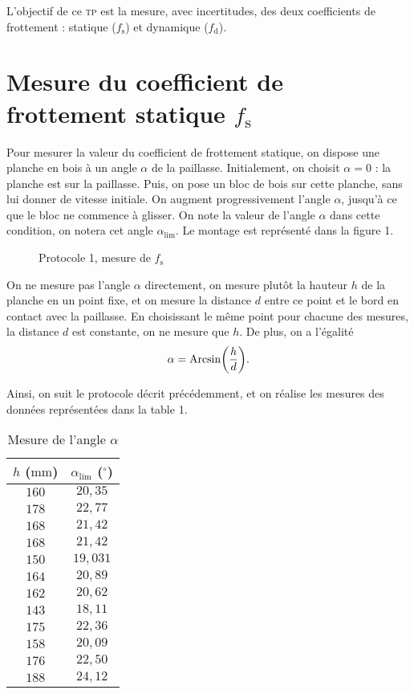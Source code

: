 \documentclass[a4paper,twocolumn,10pt]{report}
\begin{document}
	L'objectif de ce \textsc{tp} est la mesure, avec incertitudes, des deux coefficients de frottement : statique ($f_\mathrm{s}$) et dynamique ($f_\mathrm{d}$).

	\section{Mesure du coefficient de frottement statique $f_\mathrm{s}$}

	Pour mesurer la valeur du coefficient de frottement statique, on dispose une planche en bois à un angle $\alpha$\/ de la paillasse.
	Initialement, on choisit $\alpha = 0$ : la planche est sur la paillasse. Puis, on pose un bloc de bois sur cette planche, sans lui donner de vitesse initiale.
	On augment progressivement l'angle $\alpha$, jusqu'à ce que le bloc ne commence à glisser.
	On note la valeur de l'angle $\alpha$\/ dans cette condition, on notera cet angle $\alpha_{\lim}$.
	Le montage est représenté dans la figure 1.

	\begin{figure}[H]
		\centering
		\caption{Protocole 1, mesure de $f_\mathrm{s}$\/}
	\end{figure}

	On ne mesure pas l'angle $\alpha$\/ directement, on mesure plutôt la hauteur $h$\/ de la planche en un point fixe, et on mesure la distance $d$\/ entre ce point et le bord en contact avec la paillasse.
	En choisissant le même point pour chacune des mesures, la distance $d$\/ est constante, on ne mesure que $h$. De plus, on a l'égalité \[
		\alpha = \operatorname{Arcsin}\! \left( \frac{h}{d} \right)\!
	.\]
	
	Ainsi, on suit le protocole décrit précédemment, et on réalise les mesures des données représentées dans la table 1.

	\begin{table}[H]
		\centering
		\begin{tabular}{|c|c|}
			\hline
			$h$\/ ($\mathrm{mm}$) & $\alpha_{\lim}$\/ ($^\circ$)\\ \hline \hline
			$160$&$20{,}35$ \\ \hline
			$178$&$22{,}77$\\ \hline
			$168$&$21{,}42$\\ \hline
			$168$&$21{,}42$\\ \hline
			$150$&$19{,}031$\\ \hline
			$164$&$20{,}89$\\ \hline
			$162$&$20{,}62$\\ \hline
			$143$&$18{,}11$\\ \hline
			$175$&$22{,}36$\\ \hline
			$158$&$20{,}09$\\ \hline
			$176$&$22{,}50$\\ \hline
			$188$&$24{,}12$\\ \hline
		\end{tabular}
		\caption{Mesure de l'angle $\alpha$}
	\end{table}
\end{document}
